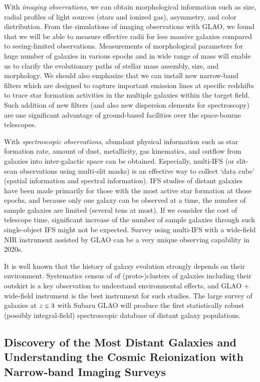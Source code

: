 With {\it imaging observations}, we can obtain morphological information
such as size, radial profiles of light sources (stars and ionized gas),
asymmetry, and color distribution. From the simulations of imaging
observations with GLAO, 
we found that we will be able to measure effective radii for less
massive galaxies compared to seeing-limited observations. Measurements
of morphological parameters for huge number of galaxies in various
epochs and in wide  range of mass will enable us to clarify the
evolutionary paths of stellar mass assembly, size, and morphology. We
should also emphasize that we can install new narrow-band filters which
are designed to capture important emission lines at specific redshifts
to trace star formation activities in the multiple galaxies within the
target field. Such addition of new filters (and also new dispersion 
elements for spectroscopy) are one significant advantage of ground-based
facilities over the space-bourne telescopes. 

With {\it spectroscopic observations}, abundant physical information
such as star formation rate, amount of dust, metallicity, gas
kinematics, and outflow from galaxies into inter-galactic space can be
obtained.
Especially, multi-IFS (or slit-scan observations using multi-slit masks)
is an effective way to collect `data cube' (spatial information and
spectral information). IFS studies of distant galaxies have been made 
primarily for those with the most active star formation at those
epochs, and because only one galaxy can be observed at a time, the
number of sample galaxies are limited (several tens at most). If we
consider the cost of telescope time, significant increase of the number
of sample galaxies through such single-object IFS might not be
expected. Survey using multi-IFS with a wide-field NIR instrument
assisted by GLAO can be a very unique observing capability in 2020s. 

It is well known that the history of galaxy evolution strongly depends
on their environment. Systematics census of of (proto-)clusters of
galaxies including their outskirt is a key observation to understand
environmental effects, and GLAO + wide-field instrument is the best
instrument for such studies. 
The large survey of galaxies at $z\lsim 3$ with Subaru GLAO will produce
the first statistically robust (possibly integral-field) spectroscopic
database of distant galaxy populations.


\subsection{Discovery of the Most Distant Galaxies and Understanding the
  Cosmic Reionization with Narrow-band Imaging Surveys}

